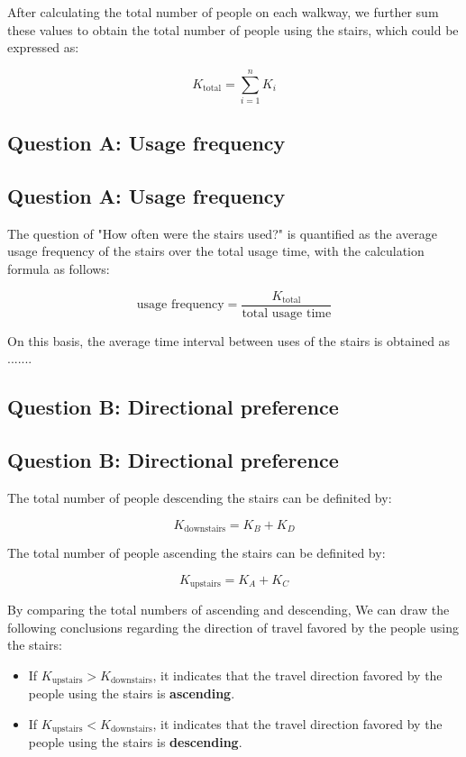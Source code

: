 \documentclass{mcmthesis}
\begin{document}
After calculating the total number of people on each walkway, we further sum these values to obtain the total number of people using the stairs, which could be expressed as:

\[ K_{\text{total}} = \sum_{i=1}^n K_i \]


\subsection{Question A: Usage frequency}
\subsection{Question A: Usage frequency}

The question of "How often were the stairs used?" is quantified as the average usage frequency of the stairs over the total usage time, with the calculation formula as follows:

\[ \text{usage frequency} = \frac{K_{\text{total}}}{\text{total usage time}} \]

On this basis, the average time interval between uses of the stairs is obtained as .......

\subsection{Question B: Directional preference}
\subsection{Question B: Directional preference}

The total number of people descending the stairs can be definited by:

\[ K_{\text{downstairs}} = K_B + K_D \]

The total number of people ascending the stairs can be definited by:

\[ K_{\text{upstairs}} = K_A + K_C \]

By comparing the total numbers of ascending and descending, We can draw the following conclusions regarding the direction of travel favored by the people using the stairs:

\begin{itemize} 

\item If $K_{\text{upstairs}}>K_{\text{downstairs}}$, it indicates that the travel direction favored by the people using the stairs is \textbf{ascending}. %

\item If $K_{\text{upstairs}}<K_{\text{downstairs}}$, it indicates that the travel direction favored by the people using the stairs is \textbf{descending}. %

\end{itemize}
\end{document}
